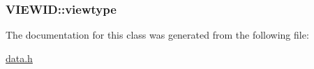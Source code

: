 \hypertarget{class_v_i_e_w_i_d_f8882c1dbed41f240794eb70bc2faa18}{
\subsubsection[{viewtype}]{ {\bf VIEWID::viewtype}}}
\label{class_v_i_e_w_i_d_f8882c1dbed41f240794eb70bc2faa18}




The documentation for this class was generated from the following file:\begin{CompactItemize}
\item 
\hyperlink{data_8h}{data.h}\end{CompactItemize}
